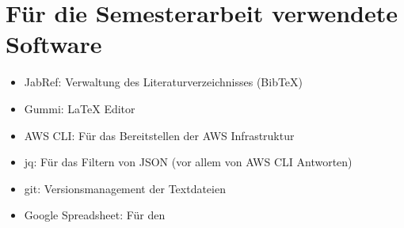 \section{Für die Semesterarbeit verwendete Software}
\begin{itemize}
\item JabRef: Verwaltung des Literaturverzeichnisses (BibTeX)
\item Gummi: LaTeX Editor
\item AWS CLI: Für das Bereitstellen der AWS Infrastruktur
\item jq: Für das Filtern von JSON (vor allem von AWS CLI Antworten)
\item git: Versionsmanagement der Textdateien
\item Google Spreadsheet: Für den 
\end{itemize}